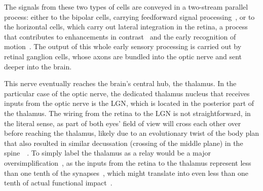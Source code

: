 The signals from these two types of cells are conveyed in a two-stream parallel process: either to the bipolar cells, carrying feedforward signal processing~\cite{ghosh2004types}, or to the horizontal cells, which carry out lateral integration in the retina, a process that contributes to enhancements in contrast~\cite{masland2012neuronal} and the early recognition of motion~\cite{olveczky2003segregation, liu2021predictive}. The output of this whole early sensory processing is carried out by retinal ganglion cells, whose axons are bundled into the optic nerve and sent deeper into the brain.

This nerve eventually reaches the brain's central hub, the thalamus. In the particular case of the optic nerve, the dedicated thalamus nucleus that receives inputs from the optic nerve is the \gls{LGN}, which is located in the posterior part of the thalamus. The wiring from the retina to the \gls{LGN} is not straightforward, in the literal sense, as part of both eyes' field of view will cross each other over before reaching the thalamus, likely due to an evolutionary twist of the body plan that also resulted in similar decussation (crossing of the middle plane) in the spine~~\cite{kinsbourne2013somatic, larsson2013optic}.
To simply label the thalamus as a relay would be a major oversimplification~\cite{sherman2007thalamus}, as the inputs from the retina to the thalamus represent less than one tenth of the synapses~\cite{ghodrati2017towards}, which might translate into even less than one tenth of actual functional impact~\cite{briggs2011corticogeniculate}.


